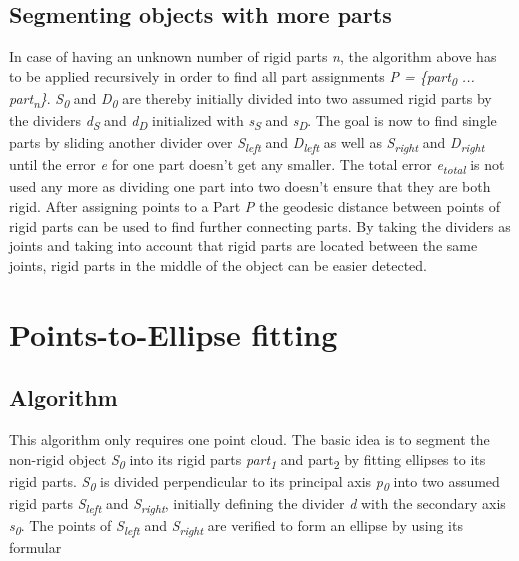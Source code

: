 \subsection{Segmenting objects with more parts}

In case of having an unknown number of rigid parts \textit{n}, the algorithm above has to be applied recursively in order to find all part assignments \textit{P = \{{part\textsubscript{0} ... part\textsubscript{n}\}}}. \textit{S\textsubscript{0}} and \textit{D\textsubscript{0}} are thereby initially divided into two assumed rigid parts by the dividers \textit{d\textsubscript{S}} and \textit{d\textsubscript{D}} initialized with \textit{s\textsubscript{S}} and \textit{s\textsubscript{D}}. The goal is now to find single parts by sliding another divider over \textit{S\textsubscript{left}} and \textit{D\textsubscript{left}} as well as \textit{S\textsubscript{right}} and \textit{D\textsubscript{right}} until the error \textit{e} for one part doesn't get any smaller. The total error \textit{e\textsubscript{total}} is not used any more as dividing one part into two doesn't ensure that they are both rigid. After assigning points to a Part \textit{P} the geodesic distance between points of rigid parts can be used to find further connecting parts. By taking the dividers as joints and taking into account that rigid parts are located between the same joints, rigid parts in the middle of the object can be easier detected.

\section{Points-to-Ellipse fitting}

\subsection{Algorithm}

This algorithm only requires one point cloud. The basic idea is to segment the non-rigid object  \textit{S\textsubscript{0}} into its rigid parts \textit{part\textsubscript{1}} and {part\textsubscript{2}} by fitting ellipses to its rigid parts. 
\textit{S\textsubscript{0}} is divided perpendicular to its principal axis \textit{p\textsubscript{0}} into two assumed rigid parts \textit{S\textsubscript{left}} and \textit{S\textsubscript{right}}, initially defining the divider \textit{d} with the secondary axis \textit{s\textsubscript{0}}. The points of \textit{S\textsubscript{left}} and \textit{S\textsubscript{right}} are verified to 
form an ellipse by using its formular


